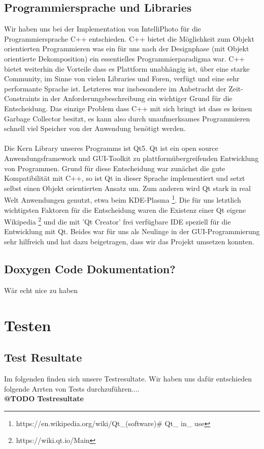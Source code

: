 \documentclass[11pt,a4paper]{article}
\begin{document}
\subsection{Programmiersprache und Libraries}
Wir haben uns bei der Implementation von IntelliPhoto für die Programmiersprache C++ entschieden. C++ bietet die Möglichkeit zum Objekt orientierten Programmieren was ein für uns nach der Designphase (mit Objekt orientierte Dekomposition) ein essentielles Programmierparadigma war. C++ bietet weiterhin die Vorteile dass es Plattform unabhängig ist, über eine starke Community, im Sinne von vielen Libraries und Foren, verfügt und eine sehr performante Sprache ist. Letzteres war insbesondere im Anbetracht der Zeit-Constraints in der Anforderungsbeschreibung ein wichtiger Grund für die Entscheidung. Das einzige Problem dass C++ mit sich bringt ist dass es keinen Garbage Collector besitzt, es kann also durch unaufmerksames Programmieren schnell viel Speicher von der Anwendung benötigt werden.\\
\\
Die Kern Library unseres Programms ist Qt5. Qt ist ein open source Anwendungsframework und GUI-Toolkit zu plattformübergreifenden Entwicklung von Programmen. Grund für diese Entscheidung war zunächst die gute Kompatibilität mit C++, so ist Qt in dieser Sprache implementiert und setzt selbst einen Objekt orientierten Ansatz um. Zum anderen wird Qt stark in real Welt Anwendungen genutzt, etwa beim KDE-Plasma \footnote{https://en.wikipedia.org/wiki/Qt\_(software)\# Qt\_ in\_ use}. Die für uns letztlich wichtigsten Faktoren für die Entscheidung waren die Existenz einer Qt eigene Wikipedia  \footnote{https://wiki.qt.io/Main} und die mit 'Qt Creator' frei verfügbare IDE speziell für die Entwicklung mit Qt. Beides war für uns als Neulinge in der GUI-Programmierung sehr hilfreich und hat dazu beigetragen, dass wir das Projekt umsetzen konnten.

\subsection{Doxygen Code Dokumentation?}
Wär echt nice zu haben


\section{Testen}
\subsection{Test Resultate}
Im folgenden finden sich unsere Testresultate. Wir haben uns dafür entschieden folgende Arrten von Tests durchzuführen....\\
\textbf{@TODO Testresultate}
\end{document}
